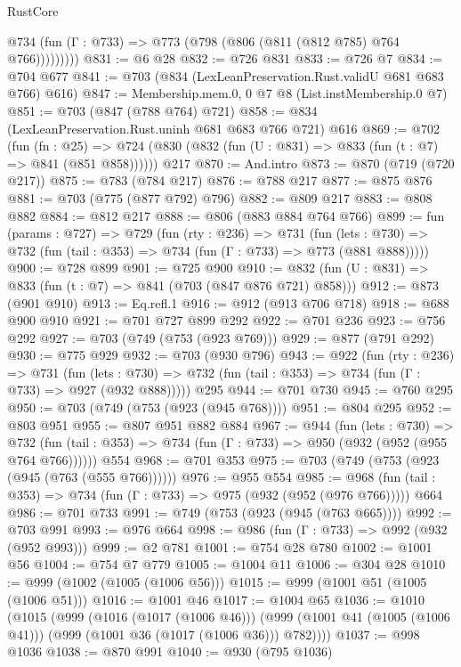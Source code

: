 \begin{lexlean}{RustCore}
\begin{coremodule}
            @734 (fun (Γ : @733) => @773 (@798 (@806 (@811 (@812 @785) @764 @766)))))))))
@831 := @6 @28
@832 := @726 @831
@833 := @726 @7
@834 := @704 @677
@841 := @703 (@834 (LexLeanPreservation.Rust.validU @681 @683 @766) @616)
@847 := Membership.mem.{0, 0} @7 @8 (List.instMembership.{0} @7)
@851 := @703 (@847 (@788 @764) @721)
@858 := @834 (LexLeanPreservation.Rust.uninh @681 @683 @766 @721) @616
@869 := @702
    (fun (fn : @25) =>
    @724 (@830 (@832 (fun (U : @831) => @833 (fun (t : @7) => @841 (@851 @858))))))
    @217
@870 := And.intro
@873 := @870 (@719 (@720 @217))
@875 := @783 (@784 @217)
@876 := @788 @217
@877 := @875 @876
@881 := @703 (@775 (@877 @792) @796)
@882 := @809 @217
@883 := @808 @882
@884 := @812 @217
@888 := @806 (@883 @884 @764 @766)
@899 := fun (params : @727) =>
  @729
    (fun (rty : @236) =>
    @731
      (fun (lets : @730) => @732 (fun (tail : @353) => @734 (fun (Γ : @733) => @773 (@881 @888)))))
@900 := @728 @899
@901 := @725 @900
@910 := @832 (fun (U : @831) => @833 (fun (t : @7) => @841 (@703 (@847 @876 @721) @858)))
@912 := @873 (@901 @910)
@913 := Eq.refl.{1}
@916 := @912 (@913 @706 @718)
@918 := @688 @900 @910
@921 := @701 @727 @899 @292
@922 := @701 @236
@923 := @756 @292
@927 := @703 (@749 (@753 (@923 @769)))
@929 := @877 (@791 @292)
@930 := @775 @929
@932 := @703 (@930 @796)
@943 := @922
    (fun (rty : @236) =>
    @731
      (fun (lets : @730) => @732 (fun (tail : @353) => @734 (fun (Γ : @733) => @927 (@932 @888)))))
    @295
@944 := @701 @730
@945 := @760 @295
@950 := @703 (@749 (@753 (@923 (@945 @768))))
@951 := @804 @295
@952 := @803 @951
@955 := @807 @951 @882 @884
@967 := @944
    (fun (lets : @730) =>
    @732 (fun (tail : @353) => @734 (fun (Γ : @733) => @950 (@932 (@952 (@955 @764 @766))))))
    @554
@968 := @701 @353
@975 := @703 (@749 (@753 (@923 (@945 (@763 (@555 @766))))))
@976 := @955 @554
@985 := @968 (fun (tail : @353) => @734 (fun (Γ : @733) => @975 (@932 (@952 (@976 @766))))) @664
@986 := @701 @733
@991 := @749 (@753 (@923 (@945 (@763 @665))))
@992 := @703 @991
@993 := @976 @664
@998 := @986 (fun (Γ : @733) => @992 (@932 (@952 @993)))
@999 := @2 @781
@1001 := @754 @28 @780
@1002 := @1001 @56
@1004 := @754 @7 @779
@1005 := @1004 @11
@1006 := @304 @28
@1010 := @999 (@1002 (@1005 (@1006 @56)))
@1015 := @999 (@1001 @51 (@1005 (@1006 @51)))
@1016 := @1001 @46
@1017 := @1004 @65
@1036 := @1010
    (@1015
      (@999
        (@1016 (@1017 (@1006 @46)))
        (@999 (@1001 @41 (@1005 (@1006 @41))) (@999 (@1001 @36 (@1017 (@1006 @36))) @782))))
@1037 := @998 @1036
@1038 := @870 @991
@1040 := @930 (@795 @1036)

\end{coremodule}
\end{lexlean}
